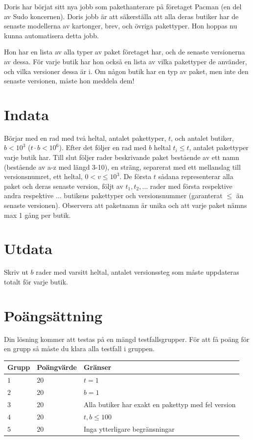 \noindent
Doris har börjat sitt nya jobb som pakethanterare på företaget Pacman (en del av Sudo koncernen). Doris jobb är att säkerställa att alla deras butiker har de senaste modellerna av kartonger, brev, och övriga pakettyper. Hon hoppas nu kunna automatisera detta jobb.

\noindent
Hon har en lista av alla typer av paket företaget har, och de senaste versionerna av dessa. För varje butik har hon också en lista av vilka pakettyper de använder, och vilka versioner dessa är i. Om någon butik har en typ av paket, men inte den senaste versionen, måste hon meddela dem! 

\section*{Indata}
\noindent
Börjar med en rad med två heltal, antalet pakettyper, $t$,  och antalet butiker, $b < 10^3$ ($t \cdot b < 10^6$). Efter det följer en rad med $b$ heltal $t_i \leq t$, antalet pakettyper varje butik har. Till slut följer rader beskrivande paket bestående av ett namn (bestående av a-z med längd 3-10), en sträng, separerat med ett mellanslag till versionsnumret, ett heltal, $0 < v \leq 10^3$. De första $t$ sådana representerar alla paket och deras senaste version, följt av $t_1, t_2, \dots$ rader med första respektive andra respektive $\dots$ butikens pakettyper och versionsnummer (garanterat $\leq$ än senaste versionen). Observera att paketnamn är unika och att varje paket nämns max 1 gång per butik.

\section*{Utdata}
\noindent
Skriv ut $b$ rader med varsitt heltal, antalet versionssteg som måste uppdateras totalt för varje butik.

\section*{Poängsättning}
\noindent
Din lösning kommer att testas på en mängd testfallsgrupper.
För att få poäng för en grupp så måste du klara alla testfall i gruppen.

\noindent
\begin{tabular}{| l | l | l |}
\hline
  Grupp & Poängvärde & Gränser \\ \hline
  $1$    & $20$       &  $t = 1$ \\ \hline 
  $2$    & $20$       &  $b = 1$ \\ \hline
  $3$    & $20$       &  Alla butiker har exakt en pakettyp med fel version \\ \hline
  $4$    & $20$       &  $t, b \leq 100$ \\ \hline
  $5$    & $20$       &  Inga ytterligare begränsningar \\ \hline
\end{tabular}
